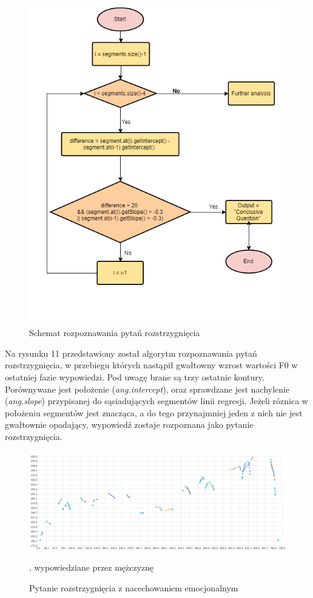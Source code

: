 \documentclass[a4paper,12 pt]{article}
\begin{document}
\begin{figure}[h]
\centering
\includegraphics[scale=1.0]{conclusive.png}
\caption{Schemat rozpoznawania pytań rozstrzygnięcia}
\end{figure}
\FloatBarrier
Na rysunku 11 przedstawiony został algorytm rozpoznawania pytań rozstrzygnięcia, w przebiegu których nastąpił gwałtowny wzrost wartości F0 w ostatniej fazie wypowiedzi. Pod uwagę brane są trzy ostatnie kontury. Porównywane jest położenie  (\textit{ang.intercept}), oraz sprawdzane jest nachylenie (\textit{ang.slope}) przypisanej do sąsiadujących segmentów linii regresji. Jeżeli róznica w położeniu segmentów jest znacząca, a do tego przynajmniej jeden z nich nie jest gwałtownie opadający, wypowiedź zostaje rozpoznana jako pytanie rozstrzygnięcia.
 \FloatBarrier
\begin{figure}[h]
\centering
\includegraphics[scale=0.6]{pytanie_rozstrzygniecia_2_emocje.png}
\caption{Pytanie rozstrzygnięcia z nacechowaniem emocjonalnym}, wypowiedziane przez mężczyznę
\end{figure}
\end{document}
